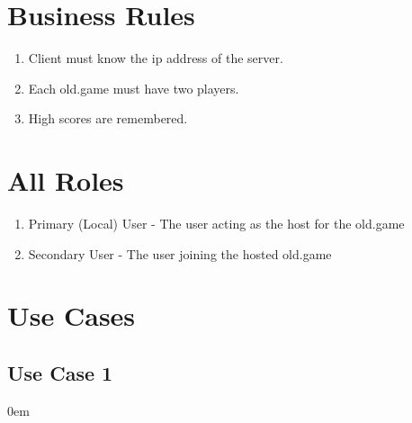 \documentclass[titlepage]{article}
\begin{document}
	\section{Business Rules}
	
	\begin{enumerate}
		\item Client must know the ip address of the server.
		\item Each old.game must have two players.
		\item High scores are remembered.
	\end{enumerate}

	\section{All Roles}
	
	\begin{enumerate}
		\item Primary (Local) User - The user acting as the host for the old.game
		\item Secondary User - The user joining the hosted old.game
	\end{enumerate}
	
	\section{Use Cases}
	\subsection{Use Case 1}
	\itemsep0em 
\end{document}
